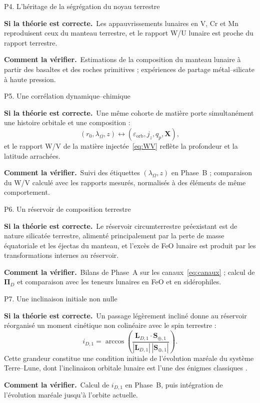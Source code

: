 \documentclass[11pt,a4paper,openany]{report}
\newcommand{\sila}{\par\noindent\textbf{Si la théorie est correcte.}\ }
\newcommand{\verif}{\par\smallskip\noindent\textbf{Comment la vérifier.}\ }
\begin{document}
\begin{prediction}{P4. L'héritage de la ségrégation du noyau terrestre}
\sila Les appauvrissements lunaires en V, Cr et Mn reproduisent ceux du manteau terrestre, et le
rapport W/U lunaire est proche du rapport terrestre.
\verif Estimations de la composition du manteau lunaire à partir des basaltes et des roches
primitives ; expériences de partage métal--silicate à haute pression.
\end{prediction}

\begin{prediction}{P5. Une corrélation dynamique--chimique}
\sila Une même cohorte de matière porte simultanément une histoire orbitale et une composition :
\begin{equation}
(r_0,\lambda_\Omega,z)\longleftrightarrow(\varepsilon_{\mathrm{orb}},j_z,q_p,\mathbf{X}),
\label{eq:correlation}
\end{equation}
et le rapport W/V de la matière injectée~\eqref{eq:WV} reflète la profondeur et la latitude
arrachées.
\verif Suivi des étiquettes $(\lambda_\Omega,z)$ en Phase~B ; comparaison du W/V calculé avec les
rapports mesurés, normalisés à des éléments de même comportement.
\end{prediction}

\begin{prediction}{P6. Un réservoir de composition terrestre}
\sila Le réservoir circumterrestre préexistant est de nature silicatée terrestre, alimenté
principalement par la perte de masse équatoriale et les éjectas du manteau, et l'excès de FeO
lunaire est produit par les transformations internes au réservoir.
\verif Bilans de Phase~A sur les canaux~\eqref{eq:canaux} ; calcul de
$\boldsymbol{\Pi}_D$ et comparaison avec les teneurs lunaires en FeO et en sidérophiles.
\end{prediction}

\begin{prediction}{P7. Une inclinaison initiale non nulle}
\sila Un passage légèrement incliné donne au réservoir réorganisé un moment cinétique non
colinéaire avec le spin terrestre :
\begin{equation}
i_{D,1}=\arccos\!\left(\frac{\mathbf{L}_{D,1}\cdot\mathbf{S}_{\oplus,1}}
{|\mathbf{L}_{D,1}|\,|\mathbf{S}_{\oplus,1}|}\right).
\label{eq:inclinaison}
\end{equation}
Cette grandeur constitue une condition initiale de l'évolution maréale du système Terre--Lune,
dont l'inclinaison orbitale lunaire est l'une des énigmes classiques \cite{PahlevanMorbidelli2015}.
\verif Calcul de $i_{D,1}$ en Phase~B, puis intégration de l'évolution maréale jusqu'à l'orbite
actuelle.
\end{prediction}
\end{document}
